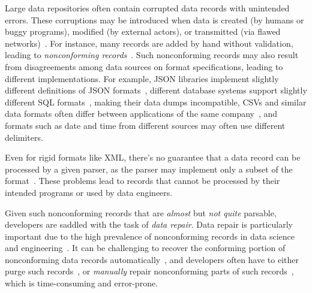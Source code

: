 \documentclass[acmsmall,screen,review,anonymous]{acmart}
\newcommand{\dtask}{data repair\xspace}
\newcommand{\Dtask}{Data repair\xspace}
\begin{document}
Large data repositories often contain corrupted data records with unintended errors.
These corruptions may be introduced when data is created (by humans or buggy programs), modified
(by external actors), or transmitted (via flawed networks)~\cite{scaffidi2008accommodating}.
For instance, many records are added by hand without validation, leading to
\textit{nonconforming records}~\cite{mucslu2015preventing}. Such nonconforming
records may also result from disagreements among data sources on format
specifications, leading to different implementations. For example, JSON
libraries implement slightly different definitions of JSON formats~\cite{harrand2021behavioral,seriot2016parsing},
different database systems support slightly different SQL formats~\cite{arvin2018comparison},
making their data dumps incompatible,
CSVs and similar data formats often differ between applications of the same
company~\cite{taocp}, and formats such as date and time from different sources
may often use different delimiters.

Even for rigid formats like XML, there's no guarantee
that a data record can be processed by a given parser, as the parser may
implement only a subset of the format~\cite{xmlconformance}.
These problems lead to records that cannot be processed by their intended
programs or used by data engineers.

Given such nonconforming records that are \emph{almost} but \emph{not quite}
parsable, developers are saddled with the task of \textit{\dtask}.
\Dtask is particularly important due to the high prevalence of nonconforming
records in data science and engineering~\cite{ridzuan2019review,kirschner2020debugging}.
It can be challenging to recover the conforming portion of nonconforming
data records automatically~\cite{scaffidi2008topes,ridzuan2019review},
and developers often have to either purge such records~\cite{hernandez1998real},
or \emph{manually} repair nonconforming parts of such records~\cite{kirschner2020debugging},
which is time-consuming and error-prone.
\end{document}
